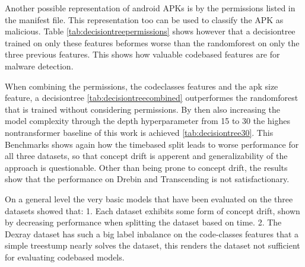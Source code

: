 Another possible representation of android APKs is by the permissions listed in the manifest file.
This representation too can be used to classify the APK as malicious.
Table \ref{tab:decisiontreepermissions} shows however that a decisiontree trained on only these features beformes worse than the randomforest on only the three previous features.
This shows how valuable codebased features are for malware detection.

When combining the permissions, the codeclasses features and the apk size feature,  a decisiontree \ref{tab:decisiontreecombined} outperformes the randomforest that is trained without considering permissions.
By then also increasing the model complexity through the depth hyperparameter from 15 to 30 the highes nontransformer baseline of this work is achieved \ref{tab:decisiontree30}.
This Benchmarks shows again how the timebased split leads to worse performance for all three datasets, so that concept drift is apperent and generalizability of the approach is questionable.
Other than being prone to concept drift, the results show that the performance on Drebin and Transcending is not satisfactionary.

On a general level the very basic models that have been evaluated on the three datasets showed that:
1. Each dataset exhibits some form of concept drift, shown by decreasing performance when splitting the dataset based on time.
2. The Dexray dataset has such a big label inbalance on the code-classes features that a simple treestump nearly solves the dataset, this renders the dataset not sufficient for evaluating codebased models.
    
\begin{table}[t]
    \caption{\label{tab:decisiontreepermissions}%
    Decision Tree (max\_depth=15) results by dataset and split. Features include Permissions.}
\end{table}
    
